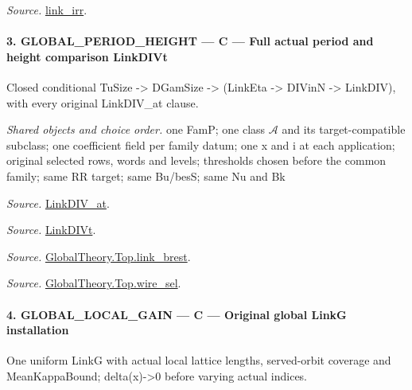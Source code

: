\documentclass[11pt,a4paper]{article}
\numberwithin{equation}{section}
\theoremstyle{remark}\newtheorem{remark}[theorem]{Remark}
\begin{document}
\emph{Source.} \href{https://github.com/CocoSgt/riemann-hypothesis-lean/blob/7cbf7a0c32fca1badf05931879a37c3f8a2b03b4/src/Development/AbelianVarietyTheory/Proofs/GlobalInterpolation/LinkIRROfJoinEx.lean#L143-L166}{link\_\allowbreak irr}.



\paragraph{3. GLOBAL\_\allowbreak PERIOD\_\allowbreak HEIGHT — C — Full actual period and height comparison LinkDIVt}

Closed conditional TuSize -> DGamSize -> (LinkEta -> DIVinN -> LinkDIV), with every original LinkDIV\_\allowbreak at clause.

\emph{Shared objects and choice order.} one FamP; one class $\mathcal A$ and its target-compatible subclass; one coefficient field per family datum; one x and i at each application; original selected rows, words and levels; thresholds chosen before the common family; same RR target; same Bu/besS; same Nu and Bk

\emph{Source.} \href{https://github.com/CocoSgt/riemann-hypothesis-lean/blob/7cbf7a0c32fca1badf05931879a37c3f8a2b03b4/src/Formalism/SharpRestriction/GlobalTheoremInputs.lean#L77-L90}{LinkDIV\_\allowbreak at}.

\emph{Source.} \href{https://github.com/CocoSgt/riemann-hypothesis-lean/blob/7cbf7a0c32fca1badf05931879a37c3f8a2b03b4/src/Formalism/SharpRestriction/GlobalTheoremInputs.lean#L94-L96}{LinkDIVt}.

\emph{Source.} \href{https://github.com/CocoSgt/riemann-hypothesis-lean/blob/7cbf7a0c32fca1badf05931879a37c3f8a2b03b4/src/Development/AbelianVarietyTheory/Proofs/GlobalInterpolation/LinkBrest.lean#L7-L25}{GlobalTheory.Top.link\_\allowbreak brest}.

\emph{Source.} \href{https://github.com/CocoSgt/riemann-hypothesis-lean/blob/7cbf7a0c32fca1badf05931879a37c3f8a2b03b4/src/Development/AbelianVarietyTheory/Proofs/GlobalInterpolation/WireSel.lean#L11-L41}{GlobalTheory.Top.wire\_\allowbreak sel}.



\paragraph{4. GLOBAL\_\allowbreak LOCAL\_\allowbreak GAIN — C — Original global LinkG installation}

One uniform LinkG with actual local lattice lengths, served-orbit coverage and MeanKappaBound; delta(x)->0 before varying actual indices.
\end{document}
